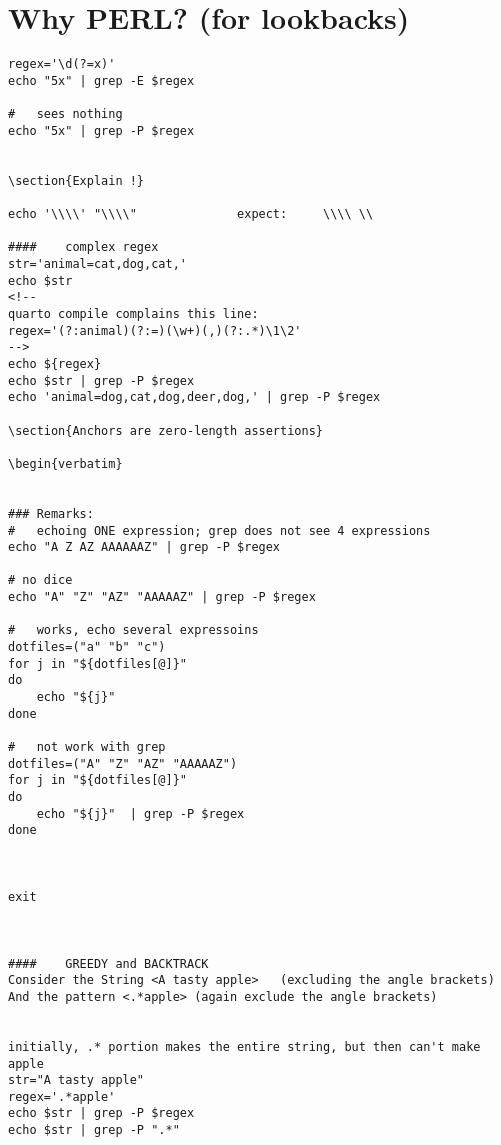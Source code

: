 \section{ Why PERL? (for lookbacks) }
\begin{verbatim}
regex='\d(?=x)'
echo "5x" | grep -E $regex

#	sees nothing
echo "5x" | grep -P $regex


\section{Explain !}

echo '\\\\' "\\\\"              expect:     \\\\ \\ 

####	complex regex
str='animal=cat,dog,cat,'
echo $str
<!--
quarto compile complains this line:
regex='(?:animal)(?:=)(\w+)(,)(?:.*)\1\2'
-->
echo ${regex}
echo $str | grep -P $regex
echo 'animal=dog,cat,dog,deer,dog,' | grep -P $regex

\section{Anchors are zero-length assertions}

\begin{verbatim}


### Remarks:
#	echoing ONE expression; grep does not see 4 expressions
echo "A Z AZ AAAAAAZ" | grep -P $regex

# no dice
echo "A" "Z" "AZ" "AAAAAZ" | grep -P $regex

#	works, echo several expressoins
dotfiles=("a" "b" "c")
for j in "${dotfiles[@]}"
do
	echo "${j}" 
done

#	not work with grep
dotfiles=("A" "Z" "AZ" "AAAAAZ")
for j in "${dotfiles[@]}"
do
	echo "${j}"  | grep -P $regex
done



exit



####	GREEDY and BACKTRACK
Consider the String <A tasty apple>   (excluding the angle brackets)
And the pattern <.*apple> (again exclude the angle brackets)


initially, .* portion makes the entire string, but then can't make apple
str="A tasty apple"
regex='.*apple'
echo $str | grep -P $regex
echo $str | grep -P ".*" 



\end{verbatim}
